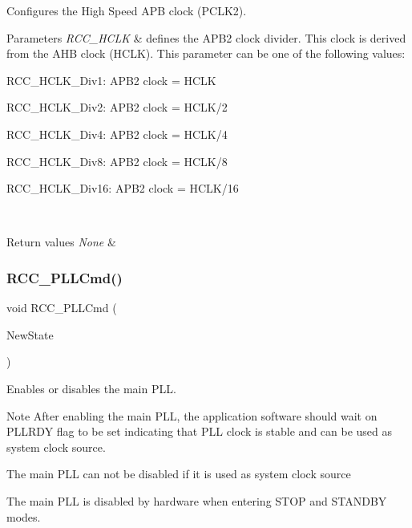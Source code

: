 Configures the High Speed A\+PB clock (P\+C\+L\+K2). 


\begin{DoxyParams}{Parameters}
{\em R\+C\+C\+\_\+\+H\+C\+LK} & defines the A\+P\+B2 clock divider. This clock is derived from the A\+HB clock (H\+C\+LK). This parameter can be one of the following values\+: \begin{DoxyItemize}
\item R\+C\+C\+\_\+\+H\+C\+L\+K\+\_\+\+Div1\+: A\+P\+B2 clock = H\+C\+LK \item R\+C\+C\+\_\+\+H\+C\+L\+K\+\_\+\+Div2\+: A\+P\+B2 clock = H\+C\+L\+K/2 \item R\+C\+C\+\_\+\+H\+C\+L\+K\+\_\+\+Div4\+: A\+P\+B2 clock = H\+C\+L\+K/4 \item R\+C\+C\+\_\+\+H\+C\+L\+K\+\_\+\+Div8\+: A\+P\+B2 clock = H\+C\+L\+K/8 \item R\+C\+C\+\_\+\+H\+C\+L\+K\+\_\+\+Div16\+: A\+P\+B2 clock = H\+C\+L\+K/16 \end{DoxyItemize}
\\
\hline
\end{DoxyParams}

\begin{DoxyRetVals}{Return values}
{\em None} & \\
\hline
\end{DoxyRetVals}
\mbox{\label{group___r_c_c_ga84dee53c75e58fdb53571716593c2272}} 
\subsubsection{\texorpdfstring{R\+C\+C\+\_\+\+P\+L\+L\+Cmd()}{RCC\_PLLCmd()}}
{\footnotesize\ttfamily void R\+C\+C\+\_\+\+P\+L\+L\+Cmd (\begin{DoxyParamCaption}\item[{Functional\+State}]{New\+State }\end{DoxyParamCaption})}



Enables or disables the main P\+LL. 

\begin{DoxyNote}{Note}
After enabling the main P\+LL, the application software should wait on P\+L\+L\+R\+DY flag to be set indicating that P\+LL clock is stable and can be used as system clock source. 

The main P\+LL can not be disabled if it is used as system clock source 

The main P\+LL is disabled by hardware when entering S\+T\+OP and S\+T\+A\+N\+D\+BY modes. 
\end{DoxyNote}

